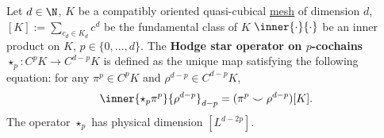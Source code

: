 \begin{definition}
  \label{cmc/mesh/quasi_cubical/hodge_star/concept-definition}
  Let
    $d \in \N$,
    $K$ be a compatibly oriented quasi-cubical
    \hyperref[cmc:mesh:definition]{mesh} of dimension $d$,
    $[K] := \sum_{c_d \in K_d} c^d$ be the fundamental class of $K$
    $\inner{\cdot}{\cdot}$ be an inner product on $K$,
    $p \in \{0, ..., d\}$.
  The \textbf{Hodge star operator on $p$-cochains}
  $\star_p \colon C^p K \to C^{d - p} K$
  is defined as the unique map satisfying the following equation:
  for any $\pi^p \in C^p K$ and $\rho^{d - p} \in C^{d - p} K$,
  \begin{equation}
    \inner{\star_p \pi^p}{\rho^{d - p}}_{d - p}
    = (\pi^p \smile \rho^{d - p})[K].
  \end{equation}
  The operator $\star_p$ has physical dimension $[L^{d - 2 p}]$.
\end{definition}
